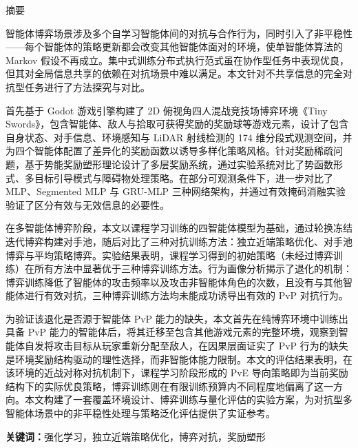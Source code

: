 \documentclass[12pt, a4paper, UTF8]{ctexart}
\makeatletter
\numberwithin{equation}{section}
\newenvironment{cnabstract}[1]{
  \def\@cnkeywords{#1}
  \clearpage
  \begin{center}
    {\zihao{-2}\heiti 摘\quad\quad 要}
  \end{center}
  \addcontentsline{toc}{section}{摘\quad\quad 要}
  \vspace{1\baselineskip}
  \zihao{-4}\songti
  \setstretch{1.354}
}{
  \par\vspace{1\baselineskip}
  \noindent\textbf{关键词：}\@cnkeywords
  \clearpage
}
\makeatother
\begin{document}
\setcounter{page}{1}
\begin{cnabstract}{强化学习，独立近端策略优化，博弈对抗，奖励塑形}

智能体博弈场景涉及多个自学习智能体间的对抗与合作行为，同时引入了非平稳性——每个智能体的策略更新都会改变其他智能体面对的环境，使单智能体算法的 Markov 假设不再成立。集中式训练分布式执行范式虽在协作型任务中表现优良，但其对全局信息共享的依赖在对抗场景中难以满足。本文针对不共享信息的完全对抗型任务进行了方法探究与对比。

首先基于 Godot 游戏引擎构建了 2D 俯视角四人混战竞技场博弈环境《Tiny Swords》，包含智能体、敌人与拾取可获得奖励的奖励球等游戏元素，设计了包含自身状态、对手信息、环境感知与 LiDAR 射线检测的 174 维分段式观测空间，并为四个智能体配置了差异化的奖励函数以诱导多样化策略风格。针对奖励稀疏问题，基于势能奖励塑形理论设计了多层奖励系统，通过实验系统对比了势函数形式、多目标引导模式与障碍物处理策略。在部分可观测条件下，进一步对比了 MLP、Segmented MLP 与 GRU-MLP 三种网络架构，并通过有效掩码消融实验验证了区分有效与无效信息的必要性。

在多智能体博弈阶段，本文以课程学习训练的四智能体模型为基础，通过轮换冻结迭代博弈构建对手池，随后对比了三种对抗训练方法：独立近端策略优化、对手池博弈与平均策略博弈。实验结果表明，课程学习得到的初始策略（未经过博弈训练）在所有方法中显著优于三种博弈训练方法。行为画像分析揭示了退化的机制：博弈训练降低了智能体的攻击频率以及攻击非智能体角色的次数，且没有与其他智能体进行有效对抗，三种博弈训练方法均未能成功诱导出有效的 PvP 对抗行为。

为验证该退化是否源于智能体 PvP 能力的缺失，本文首先在纯博弈环境中训练出具备 PvP 能力的智能体后，将其迁移至包含其他游戏元素的完整环境，观察到智能体自发将攻击目标从玩家重新分配至敌人，在因果层面证实了 PvP 行为的缺失是环境奖励结构驱动的理性选择，而非智能体能力限制。本文的评估结果表明，在该环境的近战对称对抗机制下，课程学习阶段形成的 PvE 导向策略即为当前奖励结构下的实际优良策略，博弈训练则在有限训练预算内不同程度地偏离了这一方向。本文构建了一套覆盖环境设计、博弈训练与量化评估的实验方案，为对抗型多智能体场景中的非平稳性处理与策略泛化评估提供了实证参考。

\end{cnabstract}
\end{document}
